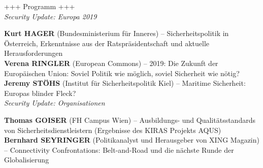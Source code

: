 \documentclass[a4paper,10pt]{article}
\begin{document}
\vspace{1em}

{\Large\colorbox{acipssbeige!20}{+++ Programm +++}}\\

{\large\emph{Security Update: Europa 2019}}

\textbf{Kurt HAGER} (Bundesministerium für Inneres) -- Sicherheitspolitik in Österreich, Erkenntnisse aus der Ratspräsidentschaft und aktuelle Herausforderungen \\
\textbf{Verena RINGLER }(European Commons) -- 2019: Die Zukunft der Europäischen Union: Soviel Politik wie möglich, soviel Sicherheit wie nötig? \\
\textbf{Jeremy STÖHS }(Institut für Sicherheitspolitik Kiel) -- Maritime Sicherheit: Europas blinder Fleck?\\

{\large\emph{Security Update: Organisationen}}

\textbf{Thomas GOISER} (FH Campus Wien) -- Ausbildungs- und Qualitätsstandards von Sicherheitsdienstleistern (Ergebnisse des KIRAS Projekts AQUS) \\
\textbf{Bernhard SEYRINGER} (Politikanalyst und Herausgeber von XING Magazin) -- Connectivity Confrontations: Belt-and-Road und die nächste Runde der Globalisierung \\

\vspace{3em}
\end{document}
